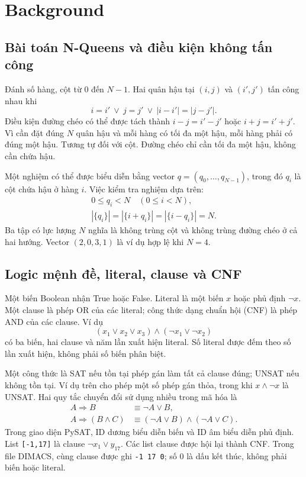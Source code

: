 \section{Background}
\label{sec:background}
\subsection{Bài toán N-Queens và điều kiện không tấn công}
Đánh số hàng, cột từ $0$ đến $N-1$. Hai quân hậu tại $(i,j)$ và $(i',j')$ tấn công nhau khi
\begin{equation}
i=i'\ \lor\ j=j'\ \lor\ |i-i'|=|j-j'|.
\label{eq:attack}
\end{equation}
Điều kiện đường chéo có thể được tách thành $i-j=i'-j'$ hoặc $i+j=i'+j'$. Vì cần đặt đúng $N$ quân hậu và mỗi hàng có tối đa một hậu, mỗi hàng phải có đúng một hậu. Tương tự đối với cột. Đường chéo chỉ cần tối đa một hậu, không cần chứa hậu.

Một nghiệm có thể được biểu diễn bằng vector $q=(q_0,\ldots,q_{N-1})$, trong đó $q_i$ là cột chứa hậu ở hàng $i$. Việc kiểm tra nghiệm dựa trên:
\begin{equation}
\begin{gathered}
0\le q_i<N\quad(0\le i<N),\\
|\{q_i\}|=|\{i+q_i\}|=|\{i-q_i\}|=N.
\end{gathered}
\label{eq:check}
\end{equation}
Ba tập có lực lượng $N$ nghĩa là không trùng cột và không trùng đường chéo ở cả hai hướng. Vector $(2,0,3,1)$ là ví dụ hợp lệ khi $N=4$.

\subsection{Logic mệnh đề, literal, clause và CNF}
Một biến Boolean nhận True hoặc False. Literal là một biến $x$ hoặc phủ định $\neg x$. Một clause là phép OR của các literal; công thức dạng chuẩn hội (CNF) là phép AND của các clause. Ví dụ
\begin{equation}
(x_1\lor x_2\lor x_3)\land(\neg x_1\lor\neg x_2)
\end{equation}
có ba biến, hai clause và năm lần xuất hiện literal. Số literal được đếm theo số lần xuất hiện, không phải số biến phân biệt.

Một công thức là SAT nếu tồn tại phép gán làm tất cả clause đúng; UNSAT nếu không tồn tại. Ví dụ trên cho phép một số phép gán thỏa, trong khi $x\land\neg x$ là UNSAT. Hai quy tắc chuyển đổi sử dụng nhiều trong mã hóa là
\begin{align}
A\Rightarrow B&\equiv\neg A\lor B,\\
A\Rightarrow(B\land C)&\equiv
(\neg A\lor B)\land(\neg A\lor C).
\end{align}
Trong giao diện PySAT, ID dương biểu diễn biến và ID âm biểu diễn phủ định. List \texttt{[-1,17]} là clause $\neg x_1\lor y_{17}$. Các list clause được hội lại thành CNF. Trong file DIMACS, cùng clause được ghi \texttt{-1 17 0}; số 0 là dấu kết thúc, không phải biến hoặc literal.

